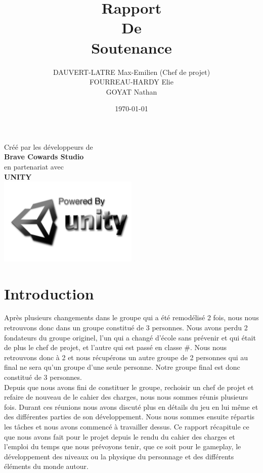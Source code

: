 \documentclass[a4paper]{article}
\title{\textbf{\huge Rapport \\ De \\ Soutenance }}
\author{DAUVERT-LATRE Max-Emilien (Chef de projet)\\ FOURREAU-HARDY Elie\\ GOYAT Nathan}
\date{\today}
\begin{document}
\maketitle
{\centering\Large Créé par les développeurs de \\ \textbf{\Huge Brave Cowards Studio}  \\ \Large en partenariat avec \\ \textbf{\huge UNITY} \\ \includegraphics[width=0.5\textwidth]{UNITY.jpg} \\ }

\pagebreak

\tableofcontents 

\pagebreak

\section{Introduction}
\vspace{0.5 cm}
Après plusieurs changements dans le groupe qui a été remodélisé 2 fois, nous nous retrouvons donc dans un groupe constitué de 3 personnes. Nous avons perdu 2 fondateurs du groupe originel, l'un qui a changé d'école sans prévenir et qui était de plus le chef de projet, et l'autre qui est passé en classe \#. Nous nous retrouvons donc à 2 et nous récupérons un autre groupe de 2 personnes qui au final ne sera qu'un groupe d'une seule personne. Notre groupe final est donc constitué de 3 personnes.\\ 
Depuis que nous avons fini de constituer le groupe, rechoisir un chef de projet et refaire de nouveau de le cahier des charges, nous nous sommes réunis plusieurs fois. Durant ces réunions nous avons discuté plus en détails du jeu en lui même et des différentes parties de son développement. Nous nous sommes ensuite répartis les tâches et nous avons commencé à travailler dessus. Ce rapport récapitule ce que nous avons fait pour le projet depuis le rendu du cahier des charges et l'emploi du temps que nous prévoyons tenir, que ce soit pour le gameplay, le développement des niveaux ou la physique du personnage et des différents éléments du monde autour.
\end{document}
